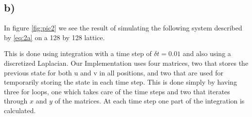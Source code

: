 \subsection*{b)}

In figure \ref{fig:pic2} we see the result of simulating the following system described by \eqref{eq:2a} on a 128 by 128 lattice.

This is done using integration with a time step of $\delta t = 0.01$ and also using a discretized Laplacian. Our Implementation uses four matrices, two that stores the previous state for both u and v in all positions, and two that are used for temporarily storing the state in each time step. This is done simply by having three for loops, one which takes care of the time steps and two that iterates through $x$ and $y$ of the matrices. At each time step one part of the integration is calculated.

